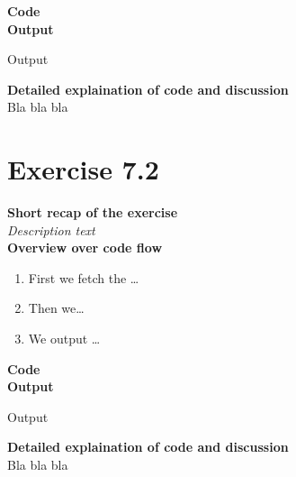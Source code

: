 \documentclass{article}
\newcommand\pythonstyle{\lstset{
language=python,
breaklines=true,
basicstyle=\ttfamily\small,
otherkeywords={1, 2, 3, 4, 5, 6, 7, 8 ,9 , 0, -, =, +, [, ], (, ), \{, \}, :, *, !},             %
keywordstyle=\color{blue},
emph={class, pass, in, for, while, if, is, elif, else, not, and, or, OR
    def, print, exec, break, continue, return},
emphstyle=\color{black}\bfseries,
emph={[2]True, False, None, self},
emphstyle=[2]\color{purple},
emph={[3]from, import, as},
emphstyle=[3]\color{blue},
stringstyle=\color{red},
frame=tb,
showstringspaces=false,
morecomment=[s]{"""}{"""},
commentstyle=\color{gray},
rulesepcolor=\color{blue},
title=\lstname
}}
\newcommand\pythonexternal[2][]{{
\pythonstyle
}}
\begin{document}
\textbf{Code}\\
\textbf{Output}
\begin{pythonOutput}
Output
\end{pythonOutput}
\textbf{Detailed explaination of code and discussion}\\
Bla bla bla

\section{Exercise 7.2}
\textbf{Short recap of the exercise}\\
\textit{Description text}\\

\textbf{Overview over code flow}\\

\begin{enumerate}
  \item First we fetch the \ldots
  \item Then we\ldots
  \item We output \ldots\\
\end{enumerate}

\textbf{Code}\\
\textbf{Output}
\begin{pythonOutput}
Output
\end{pythonOutput}
\textbf{Detailed explaination of code and discussion}\\
Bla bla bla
\end{document}
